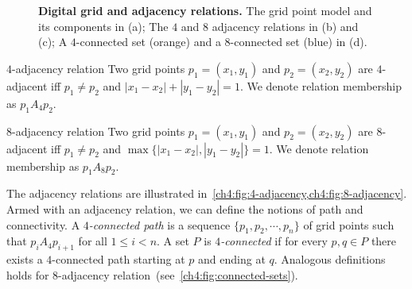 \begin{figure}
\begin{minipage}{0.4\textwidth}
\end{minipage}

\caption{\textbf{Digital grid and adjacency relations.} The grid point model and its components in (a); The $4$ and $8$ adjacency relations in (b) and (c); A $4$-connected set (orange) and a $8$-connected set (blue) in (d).}
\label{ch4:fig:digital-grid}
\end{figure}

\begin{definition}{$4$-adjacency relation}
Two grid points $p_1=(x_1,y_1)$ and $p_2=(x_2,y_2)$ are $4$-adjacent iff $p_1 \neq p_2$ and $|x_1-x_2| + |y_1-y_2| = 1$. We denote relation membership as $p_1A_4p_2$.
\end{definition}

\begin{definition}{$8$-adjacency relation}
Two grid points $p_1=(x_1,y_1)$ and $p_2=(x_2,y_2)$ are $8$-adjacent iff $p_1 \neq p_2$ and $\max \{ |x_1-x_2|, |y_1-y_2| \} = 1$. We denote relation membership as $p_1A_8p_2$.
\end{definition}

The adjacency relations are illustrated in~\cref{ch4:fig:4-adjacency,ch4:fig:8-adjacency}. Armed with an adjacency relation, we can define the notions of path and connectivity. A \emph{$4$-connected path} is a sequence $\{p_1,p_2,\cdots, p_n\}$ of grid points such that $p_iA_4p_{i+1}$ for all $1 \leq i < n$. A set $P$ is \emph{$4$-connected} if for every $p,q \in P$ there exists a $4$-connected path starting at $p$ and ending at $q$. Analogous definitions holds for $8$-adjacency relation~(see~\cref{ch4:fig:connected-sets}).


